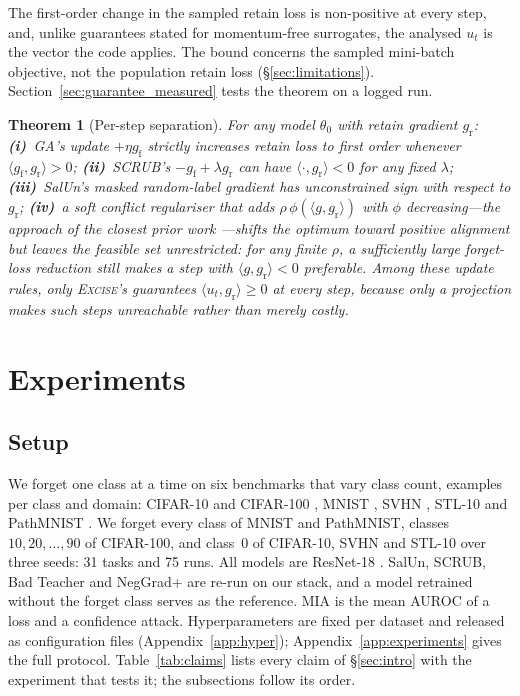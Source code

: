 \documentclass{article}
\newcommand{\ours}{\textsc{Excise}}
\newcommand{\gf}{g_{\mathrm{f}}}
\newcommand{\gr}{g_{\mathrm{r}}}
\newcommand{\rev}[1]{{\color{revisedB}#1}}
\newtheorem{theorem}{Theorem}
\theoremstyle{remark}
\theoremstyle{plain}
\begin{document}
The first-order change in the sampled retain loss is non-positive at every step,
and, unlike guarantees stated for momentum-free surrogates, the analysed $u_t$ is
the vector the code applies. The bound concerns the sampled mini-batch objective,
not the population retain loss (\S\ref{sec:limitations}).
\rev{Section~\ref{sec:guarantee_measured} tests the theorem on a logged run.}

\begin{theorem}[Per-step separation]\label{thm:separation}
For any model $\theta_0$ with retain gradient $\gr$:
\textbf{(i)}~GA's update $+\eta\gf$ strictly increases retain loss to first
order whenever $\langle\gf,\gr\rangle>0$;
\textbf{(ii)}~SCRUB's $-\gf+\lambda\gr$ can have $\langle\cdot,\gr\rangle<0$ for
any fixed $\lambda$;
\textbf{(iii)}~SalUn's masked random-label gradient has unconstrained sign with
respect to $\gr$;
\textbf{(iv)}~a soft conflict regulariser that adds $\rho\,\phi(\langle
g,\gr\rangle)$ with $\phi$ decreasing---the approach of the closest prior work
\citep{patel2025learning}---shifts the optimum toward positive alignment but
leaves the feasible set unrestricted: for any finite $\rho$, a sufficiently
large forget-loss reduction still makes a step with $\langle g,\gr\rangle<0$
preferable.
\rev{Among these update rules, only \ours{}'s} guarantees
$\langle u_t,\gr\rangle \ge 0$ \rev{at every step}, because only a projection
makes such steps unreachable rather than merely costly.
\end{theorem}

\section{Experiments}\label{sec:experiments}

\subsection{Setup}\label{sec:setup}

We forget one class at a time on six benchmarks that vary class count, examples
per class and domain: CIFAR-10 and CIFAR-100 \citep{krizhevsky2009cifar}, MNIST
\citep{lecun1998mnist}, SVHN \citep{netzer2011svhn}, STL-10
\citep{coates2011stl10} and PathMNIST \citep{yang2023medmnist}. We forget every
class of MNIST and PathMNIST, \rev{classes $10, 20, \dots, 90$ of CIFAR-100}, and
class~0 of CIFAR-10, SVHN and STL-10 over three seeds: 31 tasks and 75 runs. All
models are ResNet-18 \citep{he2016resnet}. \rev{SalUn, SCRUB, Bad Teacher and
NegGrad+ are re-run on our stack, and a model retrained without the forget class
serves as the reference. MIA is the mean AUROC of a loss and a confidence
attack.} Hyperparameters are fixed per dataset and released as configuration
files (Appendix~\ref{app:hyper}); Appendix~\ref{app:experiments} gives the full
protocol. \rev{Table~\ref{tab:claims} lists every claim of \S\ref{sec:intro}
with the experiment that tests it; the subsections follow its order.}
\end{document}
